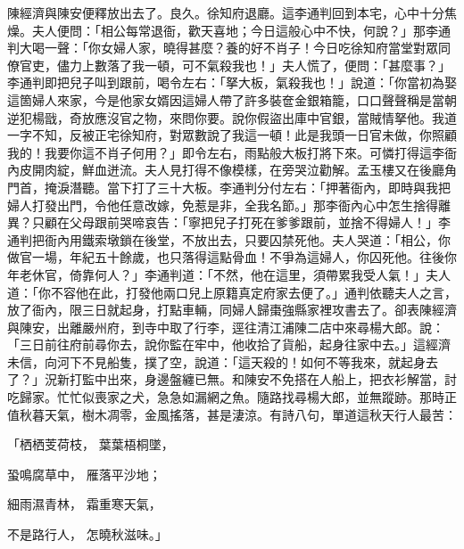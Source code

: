 陳經濟與陳安便釋放出去了。良久。徐知府退廳。這李通判回到本宅，心中十分焦燥。夫人便問：「相公每常退衙，歡天喜地；今日這般心中不快，何說？」那李通判大喝一聲：「你女婦人家，曉得甚麼？養的好不肖子！今日吃徐知府當堂對眾同僚官吏，儘力上數落了我一頓，可不氣殺我也！」夫人慌了，便問：「甚麼事？」李通判即把兒子叫到跟前，喝令左右：「拏大板，氣殺我也！」說道：「你當初為娶這箇婦人來家，今是他家女婿因這婦人帶了許多裝奩金銀箱籠，口口聲聲稱是當朝逆犯楊戩，奇放應沒官之物，來問你要。說你假盜出庫中官銀，當賊情拏他。我道一字不知，反被正宅徐知府，對眾數說了我這一頓！此是我頭一日官未做，你照顧我的！我要你這不肖子何用？」即令左右，雨點般大板打將下來。可憐打得這李衙內皮開肉綻，鮮血迸流。夫人見打得不像模樣，在旁哭泣勸解。孟玉樓又在後廳角門首，掩淚潛聽。當下打了三十大板。李通判分付左右：「押著衙內，即時與我把婦人打發出門，令他任意改嫁，免惹是非，全我名節。」那李衙內心中怎生捨得離異？只顧在父母跟前哭啼哀告：「寧把兒子打死在爹爹跟前，並捨不得婦人！」李通判把衙內用鐵索墩鎖在後堂，不放出去，只要囚禁死他。夫人哭道：「相公，你做官一場，年紀五十餘歲，也只落得這點骨血！不爭為這婦人，你囚死他。往後你年老休官，倚靠何人？」李通判道：「不然，他在這里，須帶累我受人氣！」夫人道：「你不容他在此，打發他兩口兒上原籍真定府家去便了。」通判依聽夫人之言，放了衙內，限三日就起身，打點車輛，同婦人歸棗強縣家裡攻書去了。卻表陳經濟與陳安，出離嚴州府，到寺中取了行李，逕往清江浦陳二店中來尋楊大郎。說：「三日前往府前尋你去，說你監在牢中，他收拾了貨船，起身往家中去。」這經濟未信，向河下不見船隻，撲了空，說道：「這天殺的！如何不等我來，就起身去了？」況新打監中出來，身邊盤纏已無。和陳安不免搭在人船上，把衣衫解當，討吃歸家。忙忙似喪家之犬，急急如漏網之魚。隨路找尋楊大郎，並無蹤跡。那時正值秋暮天氣，樹木凋零，金風搖落，甚是淒涼。有詩八句，單道這秋天行人最苦：

「栖栖芰荷枝，  葉葉梧桐墜，

蛩鳴腐草中，  雁落平沙地；

細雨濕青林，  霜重寒天氣，

不是路行人，  怎曉秋滋味。」

